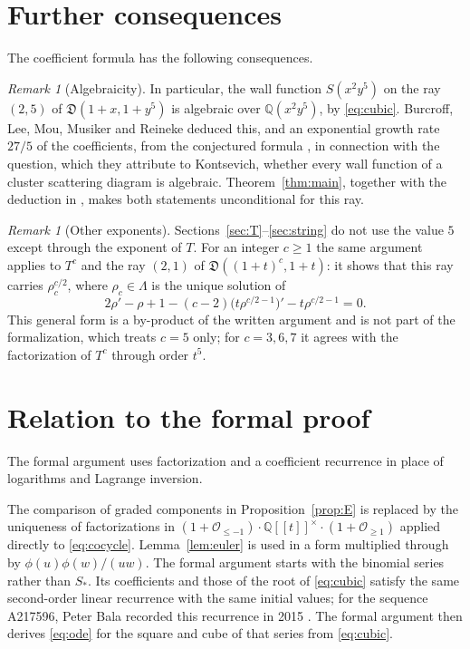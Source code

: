 \documentclass[11pt]{article}
\theoremstyle{definition}
\theoremstyle{remark}
\newtheorem{remark}[theorem]{Remark}
\numberwithin{equation}{section}
\newcommand{\Q}{\mathbb{Q}}
\newcommand{\ps}[1]{\Q[\![#1]\!]}
\newcommand{\Oge}[1]{\mathcal{O}_{\geq #1}}
\newcommand{\Ole}[1]{\mathcal{O}_{\leq #1}}
\newcommand{\Sst}{S_{*}}
\begin{document}
\begin{appendices}
\section{Further consequences}\label{sec:consequences}
The coefficient formula has the following consequences.

\begin{remark}[Algebraicity]\label{rem:algebraic}
In particular, the wall function $S(x^2y^5)$ on the ray $(2,5)$ of
$\mathfrak{D}(1+x,1+y^5)$ is algebraic over $\Q(x^2y^5)$, by
\eqref{eq:cubic}. Burcroff, Lee, Mou, Musiker and Reineke deduced this,
and an exponential growth rate $27/5$ of the coefficients, from the
conjectured formula \cite[\S9.3]{BLMMR}, in connection with the question,
which they attribute to Kontsevich, whether every wall function of a
cluster scattering diagram is algebraic. Theorem~\ref{thm:main}, together
with the deduction in \cite[\S9.3]{BLMMR}, makes both statements
unconditional for this ray.
\end{remark}

\begin{remark}[Other exponents]\label{rem:general}
Sections~\ref{sec:T}--\ref{sec:string} do not use the value $5$ except
through the exponent of $T$. For an integer $c\geq1$ the same argument
applies to $T^c$ and the ray $(2,1)$ of $\mathfrak{D}((1+t)^c,1+t)$: it
shows that this ray carries $\rho_c^{c/2}$, where $\rho_c\in\Lambda$ is
the unique solution of
\[
  2\rho'-\rho+1-(c-2)\big(t\rho^{c/2-1}\big)'-t\rho^{c/2-1}=0 .
\]
This general form is a by-product of the written argument and is not
part of the formalization, which treats $c=5$ only; for $c=3,6,7$ it
agrees with the factorization of $T^c$ through order $t^5$.
\end{remark}


\section{Relation to the formal proof}\label{sec:formal-details}
The formal argument uses factorization and a coefficient recurrence in
place of logarithms and Lagrange inversion.

The comparison of graded components in Proposition~\ref{prop:E} is
replaced by the uniqueness of factorizations in
$(1+\Ole{-1})\cdot\ps{t}^{\times}\cdot(1+\Oge1)$ applied directly to
\eqref{eq:cocycle}. Lemma~\ref{lem:euler} is used in a form multiplied
through by $\phi(u)\phi(w)/(uw)$.
The formal argument starts with the binomial series rather than
$\Sst$. Its coefficients and those of the root of \eqref{eq:cubic}
satisfy the same second-order linear recurrence with the same initial
values; for the sequence A217596, Peter Bala recorded this recurrence in
2015 \cite{OEIS}. The formal argument then derives \eqref{eq:ode} for
the square and cube of that series from \eqref{eq:cubic}.


\end{appendices}
\end{document}
